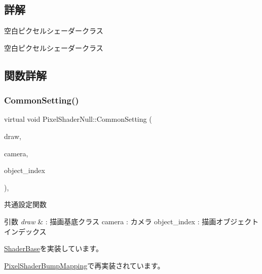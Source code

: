 \subsection{詳解}
空白ピクセルシェーダークラス 

空白ピクセルシェーダークラス 

\subsection{関数詳解}
\mbox{\label{class_pixel_shader_null_a99c712ab174da29ba26a893820b64799}} 
\subsubsection{\texorpdfstring{Common\+Setting()}{CommonSetting()}}
{\footnotesize\ttfamily virtual void Pixel\+Shader\+Null\+::\+Common\+Setting (\begin{DoxyParamCaption}\item[{\mbox{\hyperlink{class_draw_base}{Draw\+Base}} $\ast$}]{draw,  }\item[{\mbox{\hyperlink{class_camera}{Camera}} $\ast$}]{camera,  }\item[{unsigned}]{object\+\_\+index }\end{DoxyParamCaption})\hspace{0.3cm}{\ttfamily [inline]}, {\ttfamily [virtual]}}



共通設定関数 


\begin{DoxyParams}{引数}
{\em draw} & \+: 描画基底クラス camera \+: カメラ object\+\_\+index \+: 描画オブジェクトインデックス \\
\hline
\end{DoxyParams}


\mbox{\hyperlink{class_shader_base_aef6fa922223d71fbec81464ebbfaf687}{Shader\+Base}}を実装しています。



\mbox{\hyperlink{class_pixel_shader_bump_mapping_af62a2b40930533a3bae17319f876705d}{Pixel\+Shader\+Bump\+Mapping}}で再実装されています。

\mbox{\label{class_pixel_shader_null_abfd7a6a986da09061a55d31024219eba}} 
